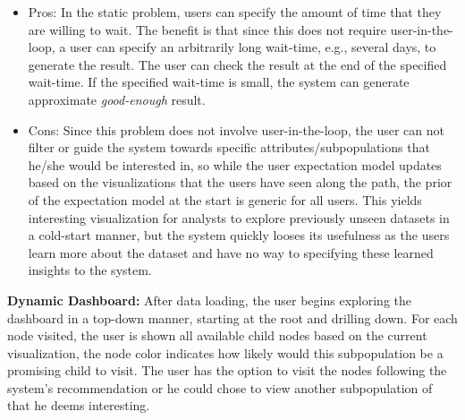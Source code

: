 \begin{itemize}
\item Pros: In the static problem, users can specify the amount of time that they are willing to wait. The benefit is that since this does not require user-in-the-loop, a user can specify an arbitrarily long wait-time, e.g., several days, to generate the result. The user can check the result at the end of the specified wait-time. If the specified wait-time is small, the system can generate approximate \emph{good-enough} result.  

\item Cons: Since this problem does not involve user-in-the-loop, the user can not filter or guide the system towards specific attributes/subpopulations that he/she would be interested in, so while the user expectation model updates based on the visualizations that the users have seen along the path, the prior of the expectation model at the start is generic for all users. This yields interesting visualization for analysts to explore previously unseen datasets in a cold-start manner, but the system quickly looses its usefulness as the users learn more about the dataset and have no way to specifying these learned insights to the system.
\end{itemize}
\newline
\newline
\textbf{Dynamic Dashboard:}
 After data loading, the user begins exploring the dashboard in a top-down manner, starting at the root and drilling down.  For each node visited, the user is shown all available child nodes based on the current visualization, the node color indicates how likely would this subpopulation be a promising child to visit. The user has the option to visit the nodes following the system's recommendation or he could chose to view another subpopulation of that he deems interesting.
 
